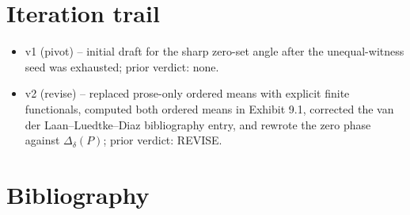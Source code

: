 \documentclass[11pt]{article}
\theoremstyle{definition}
\theoremstyle{plain}
\theoremstyle{remark}
\begin{document}
\section{Iteration trail}
\begin{itemize}[leftmargin=*]
\item v1 (pivot) -- initial draft for the sharp zero-set angle after the unequal-witness seed was exhausted; prior verdict: none.
\item v2 (revise) -- replaced prose-only ordered means with explicit finite functionals, computed both ordered means in Exhibit 9.1, corrected the van der Laan--Luedtke--Diaz bibliography entry, and rewrote the zero phase against $\Delta_\delta(P)$; prior verdict: REVISE.
\end{itemize}

\section*{Bibliography}
\end{document}
